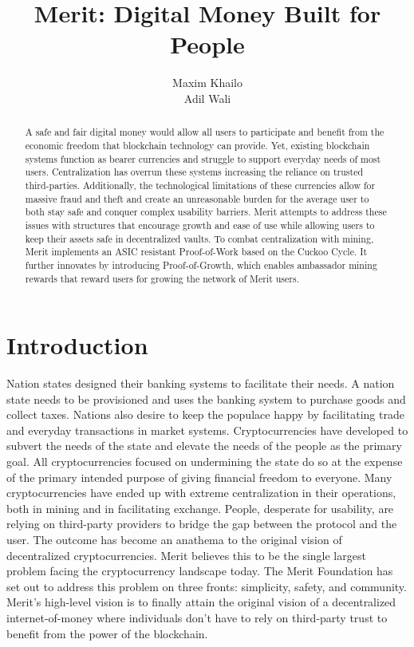 \documentclass{article}
\title{Merit: Digital Money Built for People}
\author{Maxim Khailo \\ Adil Wali}
\begin{document}
\maketitle

\begin{abstract}
    A safe and fair digital money would allow all users to participate and
    benefit from the economic freedom that \gls{blockchain} technology can provide.
    Yet, existing blockchain systems function as bearer currencies and struggle to support
     everyday needs of most users. Centralization has overrun these systems increasing
     the reliance on trusted third-parties. Additionally, the technological limitations of
     these currencies allow for massive fraud and theft and create an unreasonable burden
    for the average user to both stay safe and conquer complex usability barriers.
    Merit attempts to address these issues with structures that encourage growth 
    and ease of use while allowing users to keep their assets safe in \gls{decentralized vaults}.
    To combat centralization with mining, Merit implements an \gls{ASIC} resistant Proof-of-Work based on the
    Cuckoo Cycle.  It further innovates by introducing Proof-of-Growth, which enables ambassador mining 
    rewards that reward users for growing the network of Merit users.  
\end{abstract}

\section{Introduction}

Nation states designed their banking systems to facilitate their needs.
A nation state needs to be provisioned and uses the banking system to purchase goods
and collect taxes. Nations also desire to keep the populace happy by facilitating
trade and everyday \glspl{transaction} in market systems. Cryptocurrencies
have developed to subvert the needs of the state and elevate the needs of the
people as the primary goal. All cryptocurrencies focused on undermining the state
do so at the expense of the primary intended purpose of giving financial freedom to everyone.
Many cryptocurrencies have ended up with extreme centralization in their operations,
both in mining and in facilitating exchange. People, desperate for usability,
are relying on third-party providers to bridge the gap between the protocol and the user.
The outcome has become an anathema to the original vision of decentralized cryptocurrencies.
Merit believes this to be the single largest problem facing the cryptocurrency landscape today.
The Merit Foundation has set out to address this problem on three fronts: simplicity, safety, and community.
Merit's high-level vision is to finally attain the original vision of a decentralized internet-of-money
where individuals don't have to rely on third-party trust to benefit from the power of the blockchain.
\end{document}
